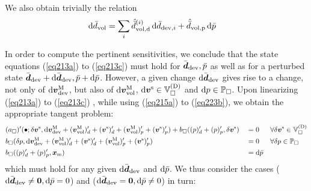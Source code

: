 \documentclass[10pt,a4paper]{article}
\newcommand{\ded}{\mathrm{d}}
\newcommand{\dep}{\mathrm{p}}
\begin{document}
We also obtain trivially the relation
\begin{align}
    \dif\bar{d}_\vol
    & = 
    \sum_{i}\hat{\bar{d}}^{(i)}_{\vol,\ded}\dif\bar{d}_{\dev,i} + \hat{\bar{d}}_{\vol,\dep}\dif\bar{p}
    \label{eq220}
\end{align}

In order to compute the pertinent sensitivities, we conclude that the state equations (\ref{eq213a}) to (\ref{eq213c}) must hold
for $\bar{\boldsymbol{d}}_{\mathrm{dev}},\bar{p}$ as well as for a perturbed state $\bar{\boldsymbol{d}}_{\mathrm{dev}}+\operatorname{d \!}\bar{\boldsymbol{d}}_{\mathrm{dev}}, \bar{p}+\operatorname{d \!}\bar{p}$. However, a given change $\operatorname{d \!}\bar{\boldsymbol{d}}_{\mathrm{dev}}$ gives rise to a change, not only of $\operatorname{d \!}\boldsymbol{v}^{\mathrm{M}}_{\mathrm{dev}}$, but also of $\operatorname{d \!}\boldsymbol{v}^{\mathrm{M}}_{\mathrm{vol}}$, $\operatorname{d \!}\boldsymbol{v}^{\mathrm{s}}\in\mathbb{V}_\Box^{(\mathrm{D})}$ and $\operatorname{d \!} p\in\mathbb{P}_\Box$. Upon linearizing (\ref{eq213a}) to (\ref{eq213c}) , while using (\ref{eq215a}) to (\ref{eq223b}), we obtain the appropriate tangent problem:
\begin{align}
    \label{eq253a} &
    (a_\Box)'(\bullet;\delta\boldsymbol{v}^{\mathrm{s}},\operatorname{d \!}\boldsymbol{v}^{\mathrm{M}}_{\mathrm{dev}}+(\boldsymbol{v}^{\mathrm{M}}_{\mathrm{vol}})'_d+(\boldsymbol{v}^{\mathrm{s}})'_d +
    (\boldsymbol{v}^{\mathrm{M}}_{\mathrm{vol}})'_p+(\boldsymbol{v}^{\mathrm{s}})'_p) +
    b_\Box((p)'_d + (p)'_p,\delta\boldsymbol{v}^{\mathrm{s}})
    && =
    0
    && \forall \delta \boldsymbol{v}^{\mathrm{s}}\in\mathbb{V}_\Box^{(\mathrm{D})}
 \\
    \label{eq253b} &
    b_\Box(\delta p,\operatorname{d \!}\boldsymbol{v}^{\mathrm{M}}_{\mathrm{dev}}+(\boldsymbol{v}^{\mathrm{M}}_{\mathrm{vol}})'_d+(\boldsymbol{v}^{\mathrm{s}})'_d +
    (\boldsymbol{v}^{\mathrm{M}}_{\mathrm{vol}})'_p+(\boldsymbol{v}^{\mathrm{s}})'_p)
    && =
    0
    && \forall \delta p\in\mathbb{P}_\Box
\\
    \label{eq253c} &
    b_\Box((p)'_d + (p)'_p,\boldsymbol{x}_{\mathrm{m}})
    && =
    \operatorname{d \!}\bar{p}
\end{align}
which must hold for any given $\operatorname{d \!}\bar{\boldsymbol{d}}_{\mathrm{dev}}$ and $\operatorname{d \!}\bar{p}$. We thus consider the cases ($\operatorname{d \!}\bar{\boldsymbol{d}}_{\mathrm{dev}}\neq \boldsymbol{0}, \operatorname{d \!}\bar{p}=0$) and ($\operatorname{d \!}\bar{\boldsymbol{d}}_{\mathrm{dev}}=\boldsymbol{0}, \operatorname{d \!}\bar{p}\neq 0$) in turn:
\end{document}
